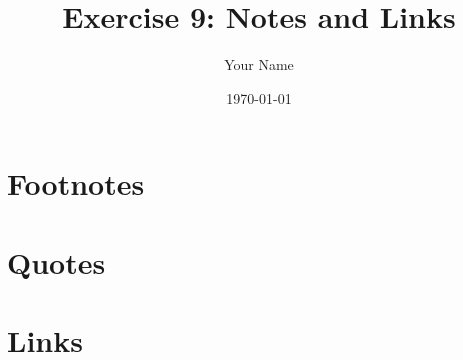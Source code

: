 \documentclass{article}
\title{Exercise 9: Notes and Links}
\author{Your Name}
\date{\today}
\begin{document}
\maketitle

\section{Footnotes}

\section{Quotes}

\section{Links}
\end{document}
